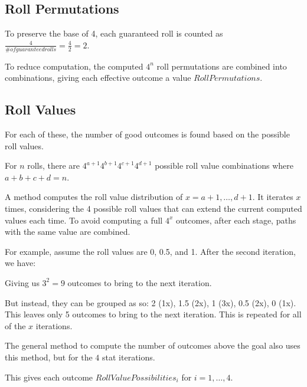 \documentclass[12pt]{article}
\begin{document}
\subsection{Roll Permutations}

To preserve the base of 4, each guaranteed roll is counted as $\frac{4}{\# of guaranteed rolls} = \frac{4}{2} = 2$.

To reduce computation, the computed $4^n$ roll permutations are combined into combinations, giving each effective outcome a value $RollPermutations$.

\subsection{Roll Values}

For each of these, the number of good outcomes is found based on the possible roll values.

For $n$ rolls, there are $4^{a+1}4^{b+1}4^{c+1}4^{d+1}$ possible roll value combinations where $a + b + c + d = n$.

A method computes the roll value distribution of $x = a+1, \dots, d+1$. It iterates $x$ times, considering the 4 possible roll values that can extend the current computed values each time. To avoid computing a full $4^x$ outcomes, after each stage, paths with the same value are combined.

For example, assume the roll values are 0, 0.5, and 1. After the second iteration, we have:


Giving us $3^2 = 9$ outcomes to bring to the next iteration.

But instead, they can be grouped as so: 2 (1x), 1.5 (2x), 1 (3x), 0.5 (2x), 0 (1x). This leaves only 5 outcomes to bring to the next iteration. This is repeated for all of the $x$ iterations.

The general method to compute the number of outcomes above the goal also uses this method, but for the $4$ stat iterations.

This gives each outcome $RollValuePossibilities_i$ for $i = 1, \dots, 4$.
\end{document}
